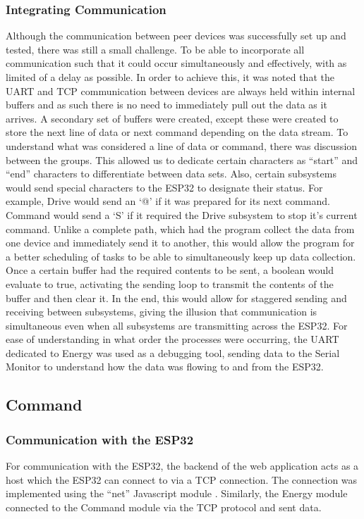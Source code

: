 \documentclass[a4paper]{article}
\begin{document}
\subsubsection{Integrating Communication}
 
Although the communication between peer devices was successfully set
up and tested, there was still a small challenge. To be able to
incorporate all communication such that it could occur simultaneously and
effectively, with as limited of a delay as possible. In order to achieve
this, it was noted that the UART and TCP communication between devices
are always held within internal buffers and as such there is no need to
immediately pull out the data as it arrives. A secondary set of buffers
were created, except these were created to store the next line of data or
next command depending on the data stream. To understand what was considered
a line of data or command, there was discussion between the groups. This
allowed us to dedicate certain characters as “start” and “end” characters
to differentiate between data sets. Also, certain subsystems would send
special characters to the ESP32 to designate their status. For example,
Drive would send an ‘@’ if it was prepared for its next command. Command
would send a ‘S’ if it required the Drive subsystem to stop it’s current
command. Unlike a complete path, which had the program collect the data
from one device and immediately send it to another, this would allow the
program for a better scheduling of tasks to be able to simultaneously keep
up data collection. Once a certain buffer had the required contents to be
sent, a boolean would evaluate to true, activating the sending loop to
transmit the contents of the buffer and then clear it. In the end, this
would allow for staggered sending and receiving between subsystems, giving
the illusion that communication is simultaneous even when all subsystems
are transmitting across the ESP32. For ease of understanding in what order
the processes were occurring, the UART dedicated to Energy was used as a
debugging tool, sending data to the Serial Monitor to understand how the
data was flowing to and from the ESP32.

\subsection{Command}

\subsubsection{Communication with the ESP32}
For communication with the ESP32, the backend of the web application acts as a 
host which the ESP32 can connect to via a TCP connection. The connection was implemented 
using the “net” Javascript module \cite{JavascriptTCP}. Similarly, the Energy module 
connected to the Command module via the TCP protocol and sent data. 
\end{document}

